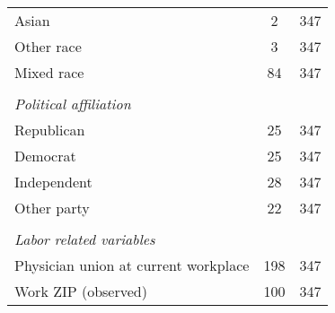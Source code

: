 \begin{tabular}{l*{1}{cc}}
Asian           &        2&      347\\
Other race      &        3&      347\\
Mixed race      &       84&      347\\
\vspace{0.1em} \\ \emph{Political affiliation}&         &         \\
Republican      &       25&      347\\
Democrat        &       25&      347\\
Independent     &       28&      347\\
Other party     &       22&      347\\
\vspace{0.1em} \\ \emph{Labor related variables}&         &         \\
Physician union at current workplace&      198&      347\\
Work ZIP (observed)&      100&      347\\
\bottomrule
\end{tabular}
